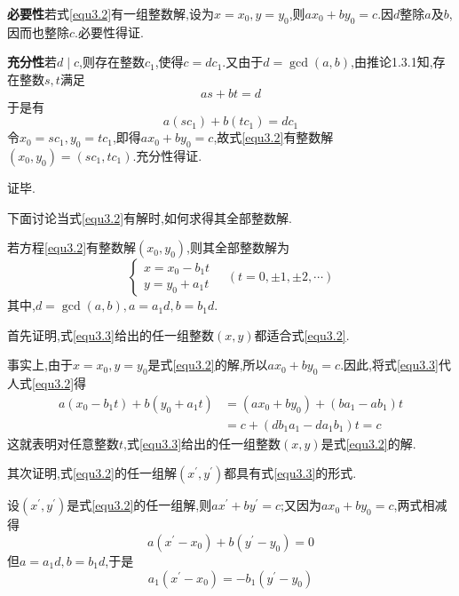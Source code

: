 \proof \textbf{必要性}\hspace{1ex}若式\eqref{equ3.2}有一组整数解,设为$x=x_{0}, y=y_{0}$,则$a x_{0}+b y_{0}=c$.因$d$整除$a$及$b$,因而也整除$c$.必要性得证. 

\textbf{充分性}\hspace{1ex}若$d \mid c$,则存在整数$c_{1}$,使得$c=d c_{1}$.又由于$d=\operatorname{gcd}(a, b)$,由推论1.3.1知,存在整数$s, t$满足
\begin{equation*}
	a s+b t=d
\end{equation*}
于是有
\begin{equation*}
	a\left(s c_{1}\right)+b\left(t c_{1}\right)=d c_{1}
\end{equation*}
令$x_{0}=s c_{1}, y_{0}=t c_{1}$,即得$a x_{0}+b y_{0}=c$,故式\eqref{equ3.2}有整数解$\left(x_{0}, y_{0}\right)=\left(s c_{1}, t c_{1}\right)$.充分性得证.

证毕.

下面讨论当式\eqref{equ3.2}有解时,如何求得其全部整数解.

\theorem 若方程\eqref{equ3.2}有整数解$\left(x_{0}, y_{0}\right)$,则其全部整数解为
\begin{equation}\label{equ3.3}
	\begin{cases}
		x=x_{0}-b_{1} t \\
		y=y_{0}+a_{1} t
	\end{cases} \quad(t=0, \pm 1, \pm 2, \cdots)
\end{equation}
其中,$d=\operatorname{gcd}(a, b), a=a_{1} d, b=b_{1} d$.

\proof 首先证明,式\eqref{equ3.3}给出的任一组整数$(x, y)$都适合式\eqref{equ3.2}.

事实上,由于$x=x_{0}, y=y_{0}$是式\eqref{equ3.2}的解,所以$a x_{0}+b y_{0}=c$.因此,将式\eqref{equ3.3}代人式\eqref{equ3.2}得
\begin{equation*}
	\begin{split}
		a\left(x_{0}-b_{1} t\right)+b\left(y_{0}+a_{1} t\right)&=\left(a x_{0}+b y_{0}\right)+\left(b a_{1}-a b_{1}\right) t \\
		&=c+\left(d b_{1} a_{1}-d a_{1} b_{1}\right) t=c
	\end{split}
\end{equation*}
这就表明对任意整数$t$,式\eqref{equ3.3}给出的任一组整数$(x, y)$是式\eqref{equ3.2}的解.

其次证明,式\eqref{equ3.2}的任一组解$\left(x^{\prime}, y^{\prime}\right)$都具有式\eqref{equ3.3}的形式.

设$\left(x^{\prime}, y^{\prime}\right)$是式\eqref{equ3.2}的任一组解,则$a x^{\prime}+b y^{\prime}=c$;又因为$a x_{0}+b y_{0}=c$,两式相减得
\begin{equation*}
	a\left(x^{\prime}-x_{0}\right)+b\left(y^{\prime}-y_{0}\right)=0
\end{equation*}
但$a=a_{1} d, b=b_{1} d$,于是
\begin{equation}\label{equ3.4}
	a_{1}\left(x^{\prime}-x_{0}\right)=-b_{1}\left(y^{\prime}-y_{0}\right)
\end{equation}

